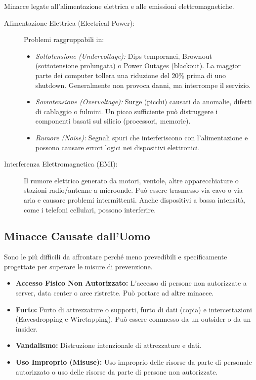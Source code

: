 Minacce legate all'alimentazione elettrica e alle emissioni elettromagnetiche.

\begin{description}
    \item[Alimentazione Elettrica (Electrical Power):] Problemi raggruppabili in:
    \begin{itemize}
        \item \textit{Sottotensione (Undervoltage):} Dips temporanei, Brownout (sottotensione prolungata) o Power Outages (blackout). La maggior parte dei computer tollera una riduzione del 20\% prima di uno shutdown. Generalmente non provoca danni, ma interrompe il servizio.
        \item \textit{Sovratensione (Overvoltage):} Surge (picchi) causati da anomalie, difetti di cablaggio o fulmini. Un picco sufficiente può distruggere i componenti basati sul silicio (processori, memorie).
        \item \textit{Rumore (Noise):} Segnali spuri che interferiscono con l'alimentazione e possono causare errori logici nei dispositivi elettronici.
    \end{itemize}
    \item[Interferenza Elettromagnetica (EMI):] Il rumore elettrico generato da motori, ventole, altre apparecchiature o stazioni radio/antenne a microonde. Può essere trasmesso via cavo o via aria e causare problemi intermittenti. Anche dispositivi a bassa intensità, come i telefoni cellulari, possono interferire.
\end{description}

\subsection{Minacce Causate dall'Uomo}

Sono le più difficili da affrontare perché meno prevedibili e specificamente progettate per superare le misure di prevenzione.

\begin{itemize}
    \item \textbf{Accesso Fisico Non Autorizzato:} L'accesso di persone non autorizzate a server, data center o aree ristrette. Può portare ad altre minacce.
    \item \textbf{Furto:} Furto di attrezzature o supporti, furto di dati (copia) e intercettazioni (Eavesdropping e Wiretapping). Può essere commesso da un outsider o da un insider.
    \item \textbf{Vandalismo:} Distruzione intenzionale di attrezzature e dati.
    \item \textbf{Uso Improprio (Misuse):} Uso improprio delle risorse da parte di personale autorizzato o uso delle risorse da parte di persone non autorizzate.
\end{itemize}

